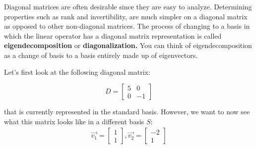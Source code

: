 


Diagonal matrices are often desirable since they are easy to analyze. 
Determining properties such as rank and invertibility, are much simpler on a diagonal matrix as opposed to other non-diagonal matrices.
The process of changing to a basis in which the linear operator has a diagonal matrix representation is called \textbf{eigendecomposition} or \textbf{diagonalization.} You can think of eigendecomposition as a change of basis to a basis entirely made up of eigenvectors.

Let's first look at the following diagonal matrix:

$$D = \begin{bmatrix}
5 & 0 \\
0 & -1
\end{bmatrix}$$

that is currently represented in the standard basis.
However, we want to now see what this matrix looks like in a different basis $S$:
\begin{gather*}
    \vec{v_1} =
    \begin{bmatrix}
      1 \\
      1
    \end{bmatrix},
    \vec{v_2} = \begin{bmatrix}
      -2 \\
      1
    \end{bmatrix}
\end{gather*}

